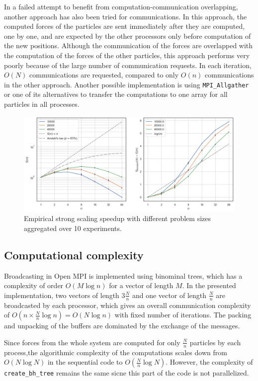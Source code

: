 \documentclass[10pt,journal,compsocconf]{IEEEtran}
\newcommand{\code}[1]{\texttt{#1}}
\begin{document}
In a failed attempt to benefit from computation-communication overlapping, another approach has also been tried for communications. In this approach, the computed forces of the particles are sent immediately after they are computed, one by one, and are expected by the other processors only before computation of the new positions. Although the communication of the forces are overlapped with the computation of the forces of the other particles, this approach performs very poorly because of the large number of communication requests. In each iteration, $O(N)$ communications are requested, compared to only $O(n)$ communications in the other approach. Another possible implementation is using \code{MPI\_Allgather} or one of its alternatives to transfer the computations to one array for all particles in all processes.

\begin{figure}[ht]
  \centering
  \includegraphics[width=.75\textwidth]{img/strongscaling.png}
  \caption{Empirical strong scaling speedup with different problem sizes aggregated over 10 experiments.}
  \label{fig:strongscaling}
\end{figure}

\subsection{Computational complexity}

Broadcasting in Open MPI is implemented using binominal trees, which has a complexity of order $O(M \log n)$ for a vector of length $M$. In the presented implementation, two vectors of length $3 \frac{N}{n}$ and one vector of length $\frac{N}{n}$ are broadcasted by each processor, which gives an overall communication complexity of $O(n \times \frac{N}{n} \log n) = O(N \log n)$ with fixed number of iterations. The packing and unpacking of the buffers are dominated by the exchange of the messages.

Since forces from the whole system are computed for only $\frac{N}{n}$ particles by each process,the algorithmic complexity of the computations scales down from $O(N \log N)$ in the sequential code to $O(\frac{N}{n} \log N)$. However, the complexity of \code{create\_bh\_tree} remains the same sicne this part of the code is not parallelized.
\end{document}
